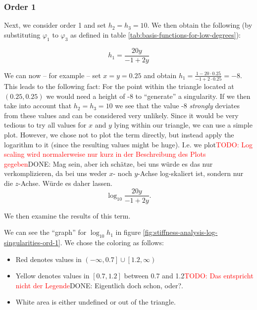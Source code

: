 \documentclass{article}
\newcommand{\todo}[2][]{\textcolor{red}{TODO\ifthenelse{\equal{#1}{}}{}{[#1]}: #2}}
\newcommand{\done}[2][]{\textcolor{green!50!black}{DONE\ifthenelse{\equal{#1}{}}{}{[#1]}: #2}}
\renewcommand{\phi}{\varphi}
\begin{document}
\subsubsection{Order 1}
\label{sec:stiffness-analysis-singluarities-ord-1}

Next, we consider order 1 and set $h_2=h_3=10$. We then obtain the following (by substituting $\phi_1$ to $\phi_3$ as defined in table \ref{tab:basis-functions-for-low-degrees}):

\begin{equation*}
  h_1 = \frac{20y}{-1+2y}
\end{equation*}

We can now -- for example -- set $x=y=0.25$ and obtain $  h_1 = \frac{1-20\cdot 0.25}{-1+2\cdot 0.25} = -8$. This leads to the following fact: For the point within the triangle located at $(0.25, 0.25)$ we would need a height of -8 to ``generate'' a singularity. If we then take into account that $h_2=h_3=10$ we see that the value -8 \emph{strongly} deviates from these values and can be considered very unlikely. Since it would be very tedious to try all values for $x$ and $y$ lying within our triangle, we can use a simple plot. However, we chose not to plot the term directly, but instead apply the logarithm to it (since the resulting values might be huge). I.e. we plot\todo{Log scaling wird normalerweise nur kurz in der Beschreibung des Plots gegeben}\done{Mag sein, aber ich schätze, bei uns würde es das nur verkomplizieren, da bei uns weder $x$- noch $y$-Achse log-skaliert ist, sondern nur die $z$-Achse. Würde es daher lassen.}
\begin{equation*}
\log_{10}\frac{20y}{-1+2y}.
\end{equation*}

We then examine the results of this term.

We can see the ``graph'' 
for $\log_{10} h_1$ in figure \ref{fig:stiffness-analysis-log-singularities-ord-1}. We chose the coloring as follows:

\begin{itemize}
\item Red denotes values in $\left( -\infty, 0.7 \right] \cup \left[ 1.2, \infty \right)$ %
\item Yellow denotes values in $\left[ 0.7, 1.2 \right]$ between 0.7 and 1.2\todo{Das entspricht nicht der Legende}\done{Eigentlich doch schon, oder?}.
\item White area is either undefined or out of the triangle.
\end{itemize}
\end{document}
